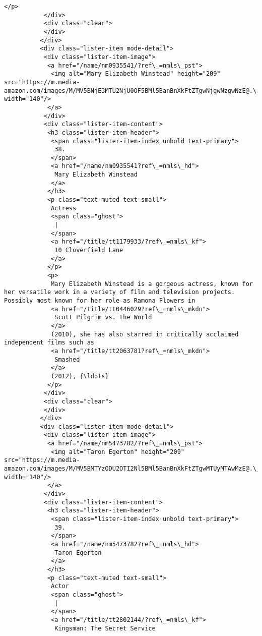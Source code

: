 \documentclass[11pt]{article}
\begin{document}
\begin{Verbatim}[commandchars=\\\{\}]
            </p>
           </div>
           <div class="clear">
           </div>
          </div>
          <div class="lister-item mode-detail">
           <div class="lister-item-image">
            <a href="/name/nm0935541/?ref\_=nmls\_pst">
             <img alt="Mary Elizabeth Winstead" height="209" src="https://m.media-amazon.com/images/M/MV5BNjE3MTU2NjU0OF5BMl5BanBnXkFtZTgwNjgwNzgwNzE@.\_V1\_UY209\_CR4,0,140,209\_AL\_.jpg" width="140"/>
            </a>
           </div>
           <div class="lister-item-content">
            <h3 class="lister-item-header">
             <span class="lister-item-index unbold text-primary">
              38.
             </span>
             <a href="/name/nm0935541?ref\_=nmls\_hd">
              Mary Elizabeth Winstead
             </a>
            </h3>
            <p class="text-muted text-small">
             Actress
             <span class="ghost">
              |
             </span>
             <a href="/title/tt1179933/?ref\_=nmls\_kf">
              10 Cloverfield Lane
             </a>
            </p>
            <p>
             Mary Elizabeth Winstead is a gorgeous actress, known for her versatile work in a variety of film and television projects. Possibly most known for her role as Ramona Flowers in
             <a href="/title/tt0446029?ref\_=nmls\_mkdn">
              Scott Pilgrim vs. the World
             </a>
             (2010), she has also starred in critically acclaimed independent films such as
             <a href="/title/tt2063781?ref\_=nmls\_mkdn">
              Smashed
             </a>
             (2012), {\ldots}
            </p>
           </div>
           <div class="clear">
           </div>
          </div>
          <div class="lister-item mode-detail">
           <div class="lister-item-image">
            <a href="/name/nm5473782/?ref\_=nmls\_pst">
             <img alt="Taron Egerton" height="209" src="https://m.media-amazon.com/images/M/MV5BMTYzODU2OTI2Nl5BMl5BanBnXkFtZTgwMTUyMTAwMzE@.\_V1\_UY209\_CR5,0,140,209\_AL\_.jpg" width="140"/>
            </a>
           </div>
           <div class="lister-item-content">
            <h3 class="lister-item-header">
             <span class="lister-item-index unbold text-primary">
              39.
             </span>
             <a href="/name/nm5473782?ref\_=nmls\_hd">
              Taron Egerton
             </a>
            </h3>
            <p class="text-muted text-small">
             Actor
             <span class="ghost">
              |
             </span>
             <a href="/title/tt2802144/?ref\_=nmls\_kf">
              Kingsman: The Secret Service

\end{Verbatim}
\end{document}
